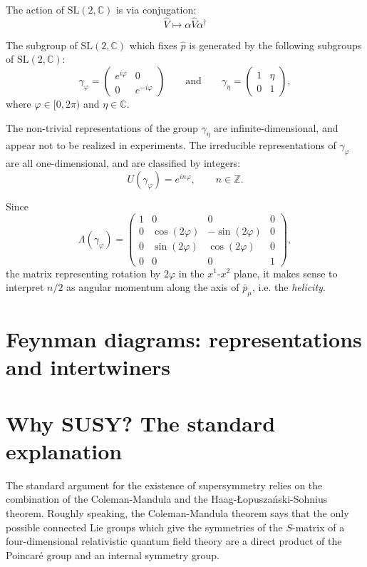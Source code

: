 \documentclass[a4paper]{report}
\newcommand{\C}{\mathbb{C}}
\newcommand{\Z}{\mathbb{Z}}
\newcommand{\SL}{\mathrm{SL}}
\theoremstyle{definition}
\theoremstyle{plain}
\theoremstyle{remark}
\begin{document}
The action of $\SL(2, \C)$ is via conjugation:
\begin{equation*}
  \hat{V} \mapsto \alpha \hat{V} \alpha^{\dagger}
\end{equation*}

The subgroup of $\SL(2, \C)$ which fixes $\hat{p}$ is generated by the following subgroups of $\SL(2, \C)$:
\begin{equation*}
  \gamma_{\varphi} = 
  \begin{pmatrix}
    e^{i \varphi} & 0 \\
    0 & e^{-i \varphi}
  \end{pmatrix}
  \qquad\text{and}\qquad \gamma_{\eta} = 
  \begin{pmatrix}
    1 & \eta \\
    0 & 1
  \end{pmatrix},
\end{equation*}
where $\varphi \in [0, 2\pi)$ and $\eta \in \C$.

The non-trivial representations of the group $\gamma_{\eta}$ are infinite-dimensional, and appear not to be realized in experiments. The irreducible representations of $\gamma_{\varphi}$ are all one-dimensional, and are classified by integers:
\begin{equation*}
  U(\gamma_{\varphi}) = e^{i n \varphi},\qquad n \in \Z.
\end{equation*}

Since
\begin{equation*}
  \Lambda(\gamma_{\varphi}) = 
  \begin{pmatrix}
    1 & 0 & 0 & 0 \\
    0 & \cos(2\varphi) & -\sin(2\varphi) & 0 \\
    0 & \sin(2\varphi) & \cos(2\varphi) & 0 \\
    0 & 0 & 0 & 1
  \end{pmatrix},
\end{equation*}
the matrix representing rotation by $2\varphi$ in the $x^{1}$-$x^{2}$ plane, it makes sense to interpret $n/2$ as angular momentum along the axis of $\bar{p}_{\mu}$, i.e. the \emph{helicity}.

\section{Feynman diagrams: representations and intertwiners}
\section{Why SUSY? The standard explanation}
The standard argument for the existence of supersymmetry relies on the combination of the Coleman-Mandula and the Haag-{\L}opusza{\'n}ski-Sohnius theorem. Roughly speaking, the Coleman-Mandula theorem says that the only possible connected Lie groups which give the symmetries of the $S$-matrix of a four-dimensional relativistic quantum field theory are a direct product of the Poincar{\'e} group and an internal symmetry group. 
\end{document}
